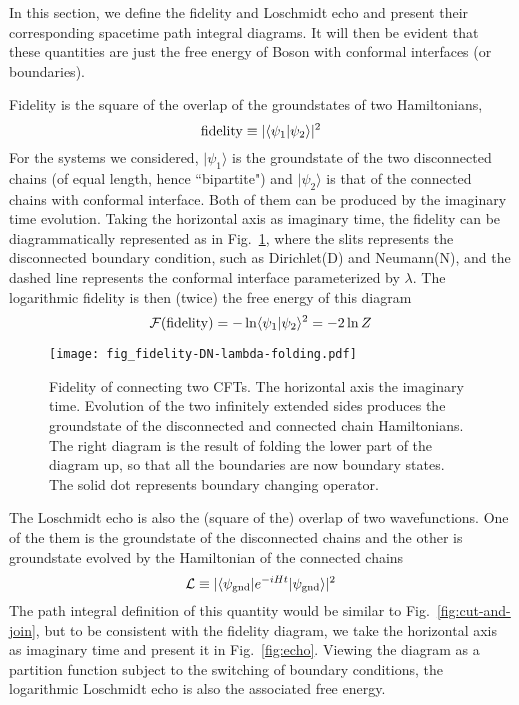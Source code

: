 
In this section, we define the fidelity and Loschmidt echo and present their corresponding spacetime path integral diagrams. It will then be evident that these quantities are just the free energy of Boson with conformal interfaces (or boundaries). 

Fidelity is the square of the overlap of the groundstates of two Hamiltonians, 
\begin{equation}
{\rm fidelity} \equiv |\langle \psi_1 |\psi_2  \rangle |^2 
\end{equation}
For the systems we considered, $|\psi_1 \rangle$ is the groundstate of the two disconnected chains (of equal length, hence ``bipartite") and $|\psi_2\rangle$ is that of the connected chains with conformal interface. Both of them can be produced by the imaginary time evolution. Taking the horizontal axis as imaginary time, the fidelity can be diagrammatically represented as in Fig.~\ref{fig:fidel}, where the slits represents the disconnected boundary condition, such as Dirichlet(D) and Neumann(N), and the dashed line represents the conformal interface parameterized by $\lambda$. The logarithmic fidelity is then (twice) the free energy of this diagram
\begin{equation}
\mathcal{F}( {\rm fidelity} )  = - \ln \langle \psi_1 |\psi_2 \rangle^2 = - 2 \ln Z
\end{equation}

\begin{figure}[h]
\texttt{[image: fig\_fidelity-DN-lambda-folding.pdf]}
\caption{Fidelity of connecting two CFTs. The horizontal axis the imaginary time. Evolution of the two infinitely extended sides produces the groundstate of the disconnected and connected chain Hamiltonians. The right diagram is the result of folding the lower part of the diagram up, so that all the boundaries are now boundary states. The solid dot represents boundary changing operator.}
\label{fig:fidel}
\end{figure}

The Loschmidt echo is also the (square of the) overlap of two wavefunctions. One of the them is the groundstate of the disconnected chains and the other is groundstate evolved by the Hamiltonian of the connected chains
\begin{equation}
\mathcal{L} \equiv |\langle \psi_{\rm gnd}  | e^{-i H t } | \psi_{\rm gnd} \rangle|^2
\end{equation}
The path integral definition of this quantity would be similar to Fig.~\ref{fig:cut-and-join}, but to be consistent with the fidelity diagram, we take the horizontal axis as imaginary time and present it in Fig.~\ref{fig:echo}. Viewing the diagram as a partition function subject to the switching of boundary conditions, the logarithmic Loschmidt echo is also the associated free energy.

